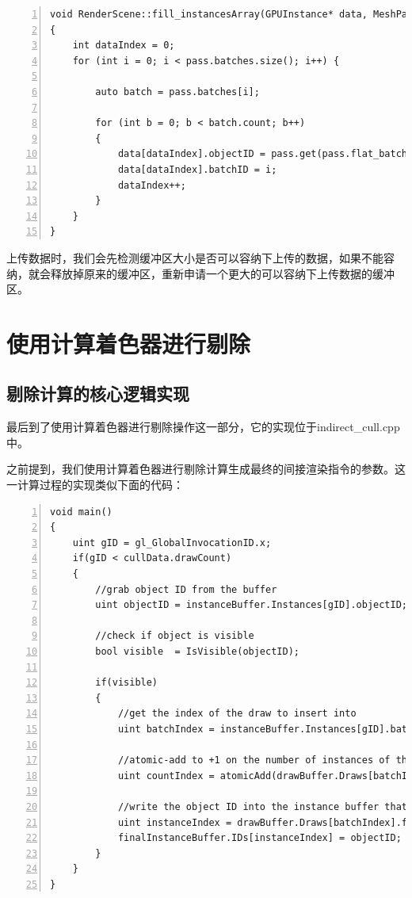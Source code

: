 \documentclass{ctexart}
\begin{document}
\begin{lstlisting}[language={[ANSI]C},keywordstyle=\color{blue!70},commentstyle=\color{red!50!green!50!blue!50},frame=shadowbox, rulesepcolor=\color{red!20!green!20!blue!20},basicstyle=\small,numbers=left, numberstyle=\tiny,breaklines=true]
void RenderScene::fill_instancesArray(GPUInstance* data, MeshPass& pass)
{
	int dataIndex = 0;
	for (int i = 0; i < pass.batches.size(); i++) {

		auto batch = pass.batches[i];

		for (int b = 0; b < batch.count; b++)
		{
			data[dataIndex].objectID = pass.get(pass.flat_batches[b + batch.first].object)->original.handle;
			data[dataIndex].batchID = i;
			dataIndex++;
		}
	}
}
\end{lstlisting}

上传数据时，我们会先检测缓冲区大小是否可以容纳下上传的数据，如果不能容纳，就会释放掉原来的缓冲区，重新申请一个更大的可以容纳下上传数据的缓冲区。

\newpage
\section{使用计算着色器进行剔除}

\subsection{剔除计算的核心逻辑实现}

最后到了使用计算着色器进行剔除操作这一部分，它的实现位于indirect\_cull.cpp中。

之前提到，我们使用计算着色器进行剔除计算生成最终的间接渲染指令的参数。这一计算过程的实现类似下面的代码：

\begin{lstlisting}[language={[ANSI]C},keywordstyle=\color{blue!70},commentstyle=\color{red!50!green!50!blue!50},frame=shadowbox, rulesepcolor=\color{red!20!green!20!blue!20},basicstyle=\small,numbers=left, numberstyle=\tiny,breaklines=true]
void main()
{
	uint gID = gl_GlobalInvocationID.x;
	if(gID < cullData.drawCount)
	{
		//grab object ID from the buffer
		uint objectID = instanceBuffer.Instances[gID].objectID;

		//check if object is visible
		bool visible  = IsVisible(objectID);

		if(visible)
		{
			//get the index of the draw to insert into
			uint batchIndex = instanceBuffer.Instances[gID].batchID;

			//atomic-add to +1 on the number of instances of that draw command
			uint countIndex = atomicAdd(drawBuffer.Draws[batchIndex].instanceCount,1);

			//write the object ID into the instance buffer that maps from gl_instanceID into ObjectID
			uint instanceIndex = drawBuffer.Draws[batchIndex].firstInstance + countIndex;
			finalInstanceBuffer.IDs[instanceIndex] = objectID;
		}
	}
}
\end{lstlisting}
\end{document}
